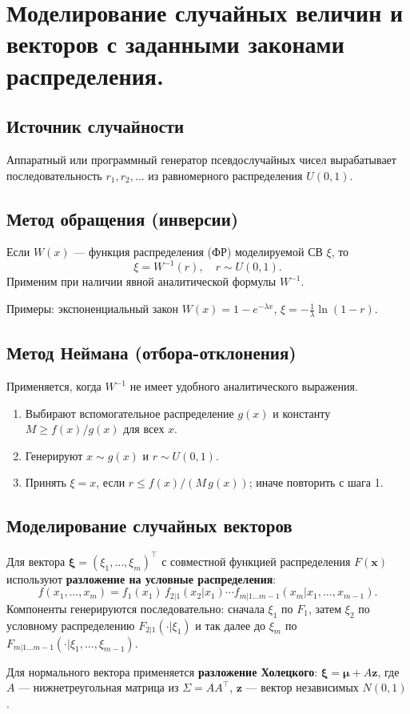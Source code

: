 \section{Моделирование случайных величин и векторов с заданными законами распределения.}

\subsection*{Источник случайности}

Аппаратный или программный генератор псевдослучайных чисел вырабатывает последовательность $r_1, r_2, \ldots$ из равномерного распределения $U(0,1)$.

\subsection*{Метод обращения (инверсии)}

Если $W(x)$ — функция распределения (ФР) моделируемой СВ $\xi$, то
\[
  \xi = W^{-1}(r), \quad r \sim U(0,1).
\]
Применим при наличии явной аналитической формулы $W^{-1}$.

Примеры: экспоненциальный закон $W(x) = 1 - e^{-\lambda x}$, $\xi = -\frac{1}{\lambda}\ln(1-r)$.

\subsection*{Метод Неймана (отбора-отклонения)}

Применяется, когда $W^{-1}$ не имеет удобного аналитического выражения.
\begin{enumerate}
  \item Выбирают вспомогательное распределение $g(x)$ и константу $M \geqslant f(x)/g(x)$ для всех $x$.
  \item Генерируют $x \sim g(x)$ и $r \sim U(0,1)$.
  \item Принять $\xi = x$, если $r \leqslant f(x)/(M\,g(x))$; иначе повторить с шага 1.
\end{enumerate}

\subsection*{Моделирование случайных векторов}

Для вектора $\boldsymbol{\xi} = (\xi_1, \ldots, \xi_m)^\top$ с совместной функцией распределения $F(\mathbf{x})$ используют \textbf{разложение на условные распределения}:
\[
  f(x_1,\ldots,x_m) = f_1(x_1)\, f_{2|1}(x_2|x_1)\cdots f_{m|1\ldots m-1}(x_m|x_1,\ldots,x_{m-1}).
\]
Компоненты генерируются последовательно: сначала $\xi_1$ по $F_1$, затем $\xi_2$ по условному распределению $F_{2|1}(\cdot|\xi_1)$ и так далее до $\xi_m$ по $F_{m|1\ldots m-1}(\cdot|\xi_1,\ldots,\xi_{m-1})$.

Для нормального вектора применяется \textbf{разложение Холецкого}: $\boldsymbol{\xi} = \boldsymbol{\mu} + A\mathbf{z}$, где $A$ — нижнетреугольная матрица из $\Sigma = AA^\top$, $\mathbf{z}$ — вектор независимых $N(0,1)$.

\clearpage
